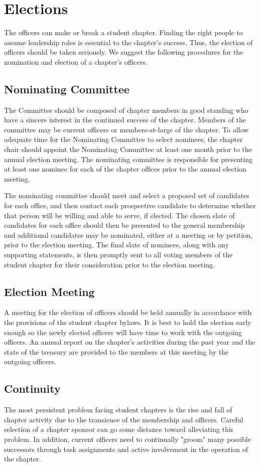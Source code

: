 \section{Elections}

The officers can make or break a student chapter. Finding the right people to assume leadership roles is essential to the chapter's success. Thus, the election of officers should be taken seriously. We suggest the following procedures for the nomination and election of a chapter's officers.
\subsection*{Nominating Committee}
The Committee should be composed of chapter members in good standing who have a sincere interest in the continued success of the chapter. Members of the committee may be current officers or members-at-large of the chapter. To allow adequate time for the Nominating Committee to select nominees, the chapter chair should appoint the Nominating Committee at least one month prior to the annual election meeting. The nominating committee is responsible for presenting at least one nominee for each of the chapter offices prior to the annual election meeting.

The nominating committee should meet and select a proposed set of candidates for each office, and then contact each prospective candidate to determine whether that person will be willing and able to serve, if elected. The chosen slate of candidates for each office should then be presented to the general membership and additional candidates may be nominated, either at a meeting or by petition, prior to the election meeting. The final slate of nominees, along with any supporting statements, is then promptly sent to all voting members of the student chapter for their consideration prior to the election meeting.
\subsection*{Election Meeting}
A meeting for the election of officers should be held annually in accordance with the provisions of the student chapter bylaws. It is best to hold the election early enough so the newly elected officers will have time to work with the outgoing officers. An annual report on the chapter's activities during the past year and the state of the treasury are provided to the members at this meeting by the outgoing officers.
\subsection*{Continuity}
The most persistent problem facing student chapters is the rise and fall of chapter activity due to the transience of the membership and officers. Careful selection of a chapter sponsor can go some distance toward alleviating this problem. In addition, current officers need to continually "groom" many possible successors through task assignments and active involvement in the operation of the chapter.

